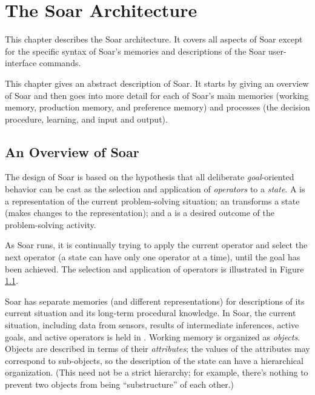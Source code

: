 \chapter{The Soar Architecture}
\label{ARCH}

This chapter describes the Soar architecture.  It covers all aspects of Soar except for the specific syntax of Soar's memories and descriptions of the Soar user-interface commands.

This chapter gives an abstract description of Soar.  It starts by giving an overview of Soar and then goes into more detail for each of Soar's main memories (working memory, production memory, and preference memory) and processes (the decision procedure, learning, and input and output).

\section{An Overview of Soar}
\label{ARCH-overview}

The design of Soar is based on the hypothesis that all deliberate \textit{goal}-oriented behavior can be cast as the selection and application of \textit{operators} to a \textit{state}. A  is a representation of the current problem-solving situation; an  transforms a state (makes changes to the representation); and a  is a desired outcome of the problem-solving activity.

As Soar runs, it is continually trying to apply the current operator and select the next operator (a state can have only one operator at a time), until the goal has been achieved. The selection and application of operators is illustrated in Figure \ref{fig:select-apply}. 

\begin{figure}
	\label{fig:select-apply}
\end{figure}

Soar has separate memories (and different representations) for descriptions of its current situation and its long-term procedural knowledge. In Soar, the current situation, including data from sensors, results of intermediate inferences, active goals, and active operators is held in .  Working memory is organized as \emph{objects}. Objects are described in terms of their \emph{attributes}; the values of the attributes may correspond to sub-objects, so the description of the state can have a hierarchical organization. (This need not be a strict hierarchy; for example, there's nothing to prevent two objects from being ``substructure'' of each other.)

